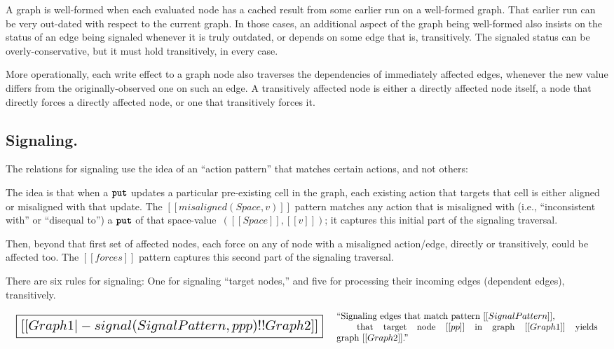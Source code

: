 \documentclass[11pt]{article}
\renewcommand{\ottkw}[1]{\textbf{\texttt{#1}}}
\begin{document}
A graph is well-formed when each evaluated node has a cached result
from some earlier run on a well-formed graph.
%
That earlier run can be very out-dated with respect to the current graph.
%
In those cases, an additional aspect of the graph being well-formed
also insists on the status of an edge being signaled whenever it is truly
outdated, or depends on some edge that is, transitively.
%
The signaled status can be overly-conservative, but it must hold
transitively, in every case.

More operationally, each write effect to a graph node also traverses
the dependencies of immediately affected edges, whenever the new value
differs from the originally-observed one on such an edge.
%
A transitively affected node is either a directly affected node
itself, a node that directly forces a directly affected node, or one
that transitively forces it.

\subsection{Signaling.}

The relations for signaling use the idea of an ``action pattern'' that
matches certain actions, and not others:

\ottgrammartabular{
  \ottSignalPattern
}

The idea is that when a $\ottkw{put}$ updates a particular pre-existing cell in the graph,
each existing action that targets that cell is either aligned or misaligned with that update.
%
The $[[misaligned(Space,v)]]$ pattern matches any action that is
misaligned with (i.e., ``inconsistent with'' or ``disequal to'') a
$\ottkw{put}$ of that space-value~$([[Space]],[[v]])$; it captures this
initial part of the signaling traversal.

Then, beyond that first set of affected nodes, each force on any of
node with a misaligned action/edge, directly or transitively, could be
affected too.
%
The $[[forces]]$ pattern captures this second part of the signaling
traversal.

There are six rules for signaling: One for signaling ``target nodes,''
and five for processing their incoming edges (dependent edges),
transitively.

\[
\begin{array}{lc}
  {\scalebox{1.5}{
  \boxed{[[Graph1 |- signal ( SignalPattern , ppp ) !! Graph2]]}}}
&
\begin{array}{p{4in}}
  ``Signaling edges that match pattern~$[[SignalPattern]]$,\\
  \hspace{4mm}~that target node~$[[pp]]$ in graph $[[Graph1]]$ yields graph~$[[Graph2]]$.''
\end{array}
\end{array}
\]
\end{document}
